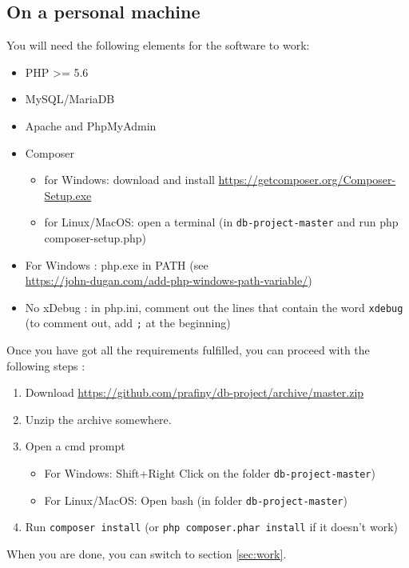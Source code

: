 \documentclass[twoside,a4paper,12pt]{article}
\begin{document}
\subsection{On a personal machine}
You will need the following elements for the software to work:
\begin{itemize}
\item PHP >= 5.6
\item MySQL/MariaDB
\item Apache and PhpMyAdmin
\item Composer 
	\begin{itemize}
		\item for Windows: download and install \url{https://getcomposer.org/Composer-Setup.exe}
		\item for Linux/MacOS: open a terminal (in \texttt{db-project-master} and run php composer-setup.php)
	\end{itemize}
\item For Windows : php.exe in PATH (see\\ \url{https://john-dugan.com/add-php-windows-path-variable/})
\item No xDebug : in php.ini, comment out the lines that contain the word \texttt{xdebug} (to comment out, add \texttt{;} at the beginning)
\end{itemize}

Once you have got all the requirements fulfilled, you can proceed with the following steps :

\begin{enumerate}
\item Download \url{https://github.com/prafiny/db-project/archive/master.zip}
\item Unzip the archive somewhere.
\item Open a cmd prompt
\begin{itemize}
	\item For Windows: Shift+Right Click on the folder \texttt{db-project-master})
	\item For Linux/MacOS: Open bash (in folder \texttt{db-project-master})
\end{itemize}
\item Run \texttt{composer install} (or \texttt{php composer.phar install} if it doesn't work)
\end{enumerate}

When you are done, you can switch to section \ref{sec:work}.
\end{document}
